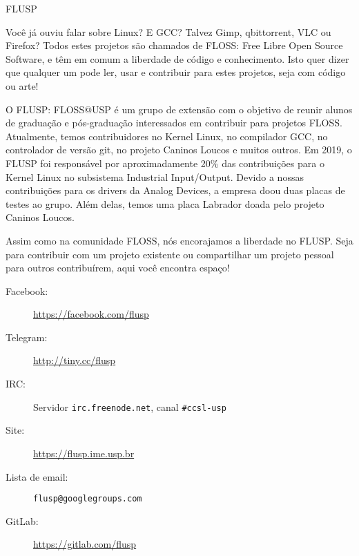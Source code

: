 \begin{subsecao}{FLUSP}


Você já ouviu falar sobre Linux? E GCC? Talvez Gimp, qbittorrent, VLC ou Firefox?
Todos estes projetos são chamados de FLOSS: Free Libre Open Source Software, e
têm em comum a liberdade de código e conhecimento. Isto quer dizer que qualquer
um pode ler, usar e contribuir para estes projetos, seja com código ou arte!

O FLUSP: FLOSS@USP é um grupo de extensão com o objetivo de reunir alunos de
graduação e pós-graduação interessados em contribuir para projetos FLOSS.
Atualmente, temos contribuidores no Kernel Linux, no compilador GCC, no controlador
de versão git, no projeto Caninos Loucos e muitos outros. Em 2019, o FLUSP
foi responsável por aproximadamente 20\% das contribuições para o Kernel Linux no
subsistema Industrial Input/Output. Devido a nossas contribuições para os drivers
da Analog Devices, a empresa doou duas placas de testes ao grupo. Além delas, temos
uma placa Labrador doada pelo projeto Caninos Loucos.

Assim como na comunidade FLOSS, nós encorajamos a liberdade no FLUSP. Seja para
contribuir com um projeto existente ou compartilhar um projeto pessoal para
outros contribuírem, aqui você encontra espaço!

\begin{description}
  \item[Facebook:] \url{https://facebook.com/flusp}
  \item[Telegram:] \url{http://tiny.cc/flusp}
  \item[IRC:] Servidor \texttt{irc.freenode.net}, canal \texttt{\#ccsl-usp}
  \item[Site:] \url{https://flusp.ime.usp.br}
  \item[Lista de email:] \texttt{flusp@googlegroups.com}
  \item[GitLab:] \url{https://gitlab.com/flusp}
\end{description}

\end{subsecao}
